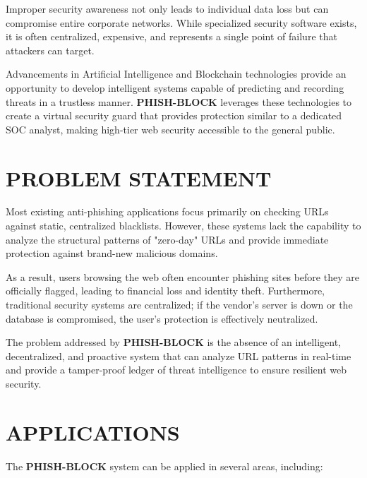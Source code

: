 Improper security awareness not only leads to individual data loss but can compromise entire corporate networks. While specialized security software exists, it is often centralized, expensive, and represents a single point of failure that attackers can target.

Advancements in Artificial Intelligence and Blockchain technologies provide an opportunity to develop intelligent systems capable of predicting and recording threats in a trustless manner. \textbf{PHISH-BLOCK} leverages these technologies to create a virtual security guard that provides protection similar to a dedicated SOC analyst, making high-tier web security accessible to the general public.

\section{PROBLEM STATEMENT}

Most existing anti-phishing applications focus primarily on checking URLs against static, centralized blacklists. However, these systems lack the capability to analyze the structural patterns of "zero-day" URLs and provide immediate protection against brand-new malicious domains.

As a result, users browsing the web often encounter phishing sites before they are officially flagged, leading to financial loss and identity theft. Furthermore, traditional security systems are centralized; if the vendor's server is down or the database is compromised, the user's protection is effectively neutralized.

The problem addressed by \textbf{PHISH-BLOCK} is the absence of an intelligent, decentralized, and proactive system that can analyze URL patterns in real-time and provide a tamper-proof ledger of threat intelligence to ensure resilient web security.

\section{APPLICATIONS}

The \textbf{PHISH-BLOCK} system can be applied in several areas, including:

